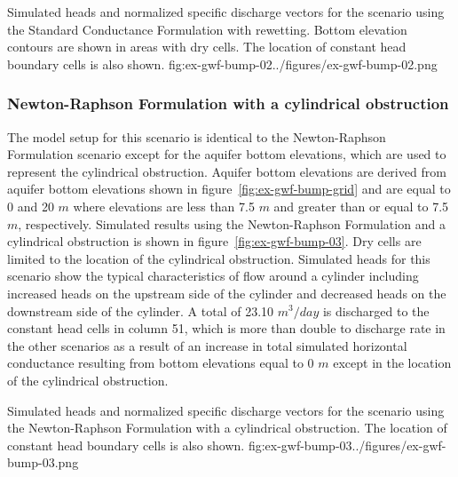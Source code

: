 \begin{StandardFigure}{
                                     Simulated heads and normalized specific discharge vectors for the scenario using 
                                     the Standard Conductance Formulation with rewetting. Bottom elevation contours 
                                     are shown in areas with dry cells. The location of constant head boundary cells is 
                                     also shown.
                                     }{fig:ex-gwf-bump-02}{../figures/ex-gwf-bump-02.png}
\end{StandardFigure}                                 

\subsubsection{Newton-Raphson Formulation with a cylindrical obstruction}

The model setup for this scenario is identical to the Newton-Raphson Formulation scenario except for the aquifer bottom elevations, which are used to represent the cylindrical obstruction. Aquifer bottom elevations are derived from aquifer bottom elevations shown in figure~\ref{fig:ex-gwf-bump-grid} and are equal to 0 and 20 $m$ where elevations are less than 7.5 $m$ and greater than or equal to 7.5 $m$, respectively. Simulated results using the Newton-Raphson Formulation and a cylindrical obstruction is shown in figure~\ref{fig:ex-gwf-bump-03}. Dry cells are limited to the location of the cylindrical obstruction. Simulated heads for this scenario show the typical characteristics of flow around a cylinder including increased heads on the upstream side of the cylinder and decreased heads on the downstream side of the cylinder. A total of 23.10 $m^3/day$ is discharged to the constant head cells in column 51, which is more than double to discharge rate in the other scenarios as a result of an increase in total simulated horizontal conductance resulting from bottom elevations equal to 0 $m$ except in the location of the cylindrical obstruction.


\begin{StandardFigure}{
                                     Simulated heads and normalized specific discharge vectors for the scenario using 
                                     the Newton-Raphson Formulation with a cylindrical obstruction. The location of 
                                     constant head boundary cells is also shown.
                                     }{fig:ex-gwf-bump-03}{../figures/ex-gwf-bump-03.png}
\end{StandardFigure}                                 
